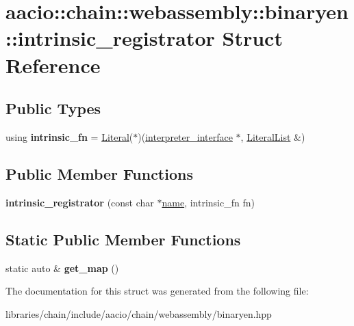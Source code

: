 \hypertarget{structaacio_1_1chain_1_1webassembly_1_1binaryen_1_1intrinsic__registrator}{}\section{aacio\+:\+:chain\+:\+:webassembly\+:\+:binaryen\+:\+:intrinsic\+\_\+registrator Struct Reference}
\label{structaacio_1_1chain_1_1webassembly_1_1binaryen_1_1intrinsic__registrator}
\subsection*{Public Types}
\begin{DoxyCompactItemize}
\item 
\mbox{\label{structaacio_1_1chain_1_1webassembly_1_1binaryen_1_1intrinsic__registrator_a1d21bee7122dc5f865e831d14b210a71}} 
using {\bfseries intrinsic\+\_\+fn} = \mbox{\hyperlink{classwasm_1_1_literal}{Literal}}($\ast$)(\mbox{\hyperlink{structaacio_1_1chain_1_1webassembly_1_1binaryen_1_1interpreter__interface}{interpreter\+\_\+interface}} $\ast$, \mbox{\hyperlink{classstd_1_1vector}{Literal\+List}} \&)
\end{DoxyCompactItemize}
\subsection*{Public Member Functions}
\begin{DoxyCompactItemize}
\item 
\mbox{\label{structaacio_1_1chain_1_1webassembly_1_1binaryen_1_1intrinsic__registrator_af9e75dcf1e69a986a45889cc96e060d7}} 
{\bfseries intrinsic\+\_\+registrator} (const char $\ast$\mbox{\hyperlink{structaacio_1_1chain_1_1name}{name}}, intrinsic\+\_\+fn fn)
\end{DoxyCompactItemize}
\subsection*{Static Public Member Functions}
\begin{DoxyCompactItemize}
\item 
\mbox{\label{structaacio_1_1chain_1_1webassembly_1_1binaryen_1_1intrinsic__registrator_a1bb638ade81a4bb2c1a1daa8d6e2b75e}} 
static auto \& {\bfseries get\+\_\+map} ()
\end{DoxyCompactItemize}


The documentation for this struct was generated from the following file\+:\begin{DoxyCompactItemize}
\item 
libraries/chain/include/aacio/chain/webassembly/binaryen.\+hpp\end{DoxyCompactItemize}
